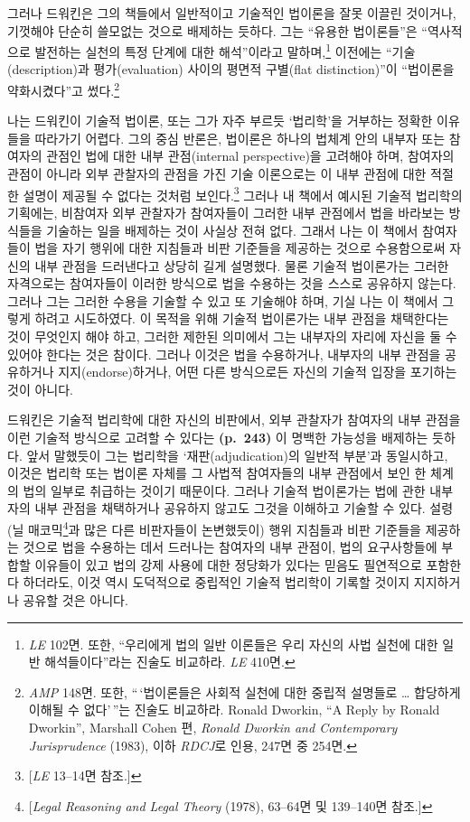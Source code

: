그러나 드워킨은 그의 책들에서 일반적이고 기술적인 법이론을 잘못 이끌린
것이거나, 기껏해야 단순히 쓸모없는 것으로 배제하는 듯하다. 그는 “유용한
법이론들”은 “역사적으로 발전하는 실천의 특정 단계에 대한 해석”이라고
말하며,\footnote{\emph{LE} 102면. 또한, “우리에게 법의 일반 이론들은
  우리 자신의 사법 실천에 대한 일반 해석들이다”라는 진술도 비교하라.
  \emph{LE} 410면.} 이전에는 “기술(description)과 평가(evaluation)
사이의 평면적 구별(flat distinction)”이 “법이론을 약화시켰다”고
썼다.\footnote{\emph{AMP} 148면. 또한, “\,‘법이론들은 사회적 실천에
  대한 중립적 설명들로 \ldots{} 합당하게 이해될 수 없다’\,”는 진술도
  비교하라. Ronald Dworkin, “A Reply by Ronald Dworkin”, Marshall
  Cohen 편, \emph{Ronald Dworkin and Contemporary Jurisprudence} (1983),
  이하 \emph{RDCJ}로 인용, 247면 중 254면.}

나는 드워킨이 기술적 법이론, 또는 그가 자주 부르듯 ‘법리학’을 거부하는
정확한 이유들을 따라가기 어렵다. 그의 중심 반론은, 법이론은 하나의
법체계 안의 내부자 또는 참여자의 관점인 법에 대한 내부 관점(internal
perspective)을 고려해야 하며, 참여자의 관점이 아니라 외부 관찰자의
관점을 가진 기술 이론으로는 이 내부 관점에 대한 적절한 설명이 제공될 수
없다는 것처럼 보인다.\footnote{{[}\emph{LE} 13--14면 참조.{]}} 그러나 내
책에서 예시된 기술적 법리학의 기획에는, 비참여자 외부 관찰자가
참여자들이 그러한 내부 관점에서 법을 바라보는 방식들을 기술하는 일을
배제하는 것이 사실상 전혀 없다. 그래서 나는 이 책에서 참여자들이 법을
자기 행위에 대한 지침들과 비판 기준들을 제공하는 것으로 수용함으로써
자신의 내부 관점을 드러낸다고 상당히 길게 설명했다. 물론 기술적
법이론가는 그러한 자격으로는 참여자들이 이러한 방식으로 법을 수용하는
것을 스스로 공유하지 않는다. 그러나 그는 그러한 수용을 기술할 수 있고 또
기술해야 하며, 기실 나는 이 책에서 그렇게 하려고 시도하였다. 이 목적을
위해 기술적 법이론가는 내부 관점을 채택한다는 것이 무엇인지
해야 하고, 그러한 제한된 의미에서 그는 내부자의 자리에 자신을
둘 수 있어야 한다는 것은 참이다. 그러나 이것은 법을 수용하거나, 내부자의
내부 관점을 공유하거나 지지(endorse)하거나, 어떤 다른 방식으로든 자신의
기술적 입장을 포기하는 것이 아니다.

드워킨은 기술적 법리학에 대한 자신의 비판에서, 외부 관찰자가 참여자의
내부 관점을 이런 기술적 방식으로 고려할 수 있다는 \textbf{(p.~243)} 이
명백한 가능성을 배제하는 듯하다. 앞서 말했듯이 그는 법리학을
‘재판(adjudication)의 일반적 부분’과 동일시하고, 이것은 법리학 또는
법이론 자체를 그 사법적 참여자들의 내부 관점에서 보인 한 체계의 법의
일부로 취급하는 것이기 때문이다. 그러나 기술적 법이론가는 법에 관한
내부자의 내부 관점을 채택하거나 공유하지 않고도 그것을 이해하고 기술할
수 있다. 설령 (닐 매코믹\footnote{{[}\emph{Legal Reasoning and Legal
  Theory} (1978), 63--64면 및 139--140면 참조.{]}}과 많은 다른
비판자들이 논변했듯이) 행위 지침들과 비판 기준들을 제공하는 것으로 법을
수용하는 데서 드러나는 참여자의 내부 관점이, 법의 요구사항들에 부합할
 이유들이 있고 법의 강제 사용에 대한  정당화가
있다는 믿음도 필연적으로 포함한다 하더라도, 이것 역시 도덕적으로
중립적인 기술적 법리학이 기록할 것이지 지지하거나 공유할 것은 아니다.

